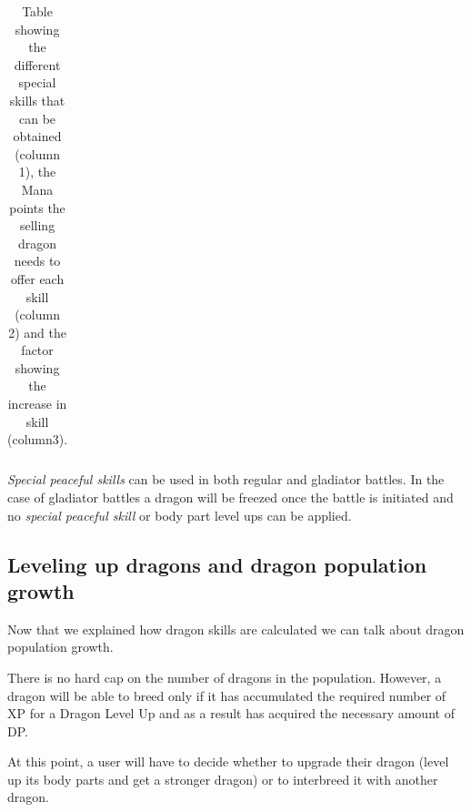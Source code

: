 \documentclass[12pt]{article}
\begin{document}
{\begin{table}[H]
\begin{tabular}{p{1.49in}p{1.92in}p{2.62in}}
\end{tabular}\caption{Table showing the different special skills that can be obtained (column 1), the Mana points the selling dragon needs to offer each skill (column 2) and the factor showing the increase in skill (column3).}
\label{tab:Table showing the different special skills that can be obtained (column 1), the Mana points the selling dragon needs to offer each skill (column 2) and the factor showing the increase in skill (column3).}

 \end{table}


\textit{Special peaceful skills} can be used in both regular and gladiator battles. In the case of gladiator battles a dragon will be freezed once the battle is initiated and no \textit{special  peaceful skill} or body part level ups can be applied.\par

\setlength{\parskip}{9.96pt}
\subsection{Leveling up dragons and dragon population growth}
 \label{Leveling up dragons and dragon population growth}   \par

Now that we explained how dragon skills are calculated we can talk about dragon population growth.\par

There is no hard cap on the number of dragons in the population. However, a dragon will be able to breed only if it has accumulated the required number of XP for a Dragon Level Up and as a result has acquired the necessary amount of DP.\par

At this point, a user will have to decide whether to upgrade their dragon (level up its body parts and get a stronger dragon) or to interbreed it with another dragon.\par

}
\end{document}
